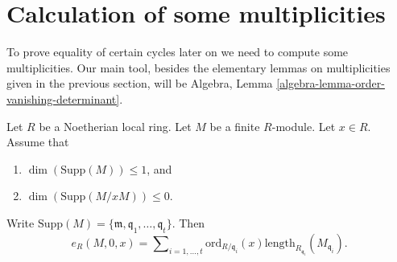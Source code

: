 \section{Calculation of some multiplicities}
\label{section-calculation}

\noindent
To prove equality of certain cycles later on we need to
compute some multiplicities. Our main tool, besides the
elementary lemmas on multiplicities given in the previous section,
will be Algebra, Lemma \ref{algebra-lemma-order-vanishing-determinant}.

\begin{lemma}
\label{lemma-length-multiplication}
Let $R$ be a Noetherian local ring.
Let $M$ be a finite $R$-module. Let $x \in R$. Assume that
\begin{enumerate}
\item $\dim(\text{Supp}(M)) \leq 1$, and
\item $\dim(\text{Supp}(M/xM)) \leq 0$.
\end{enumerate}
Write
$\text{Supp}(M) = \{\mathfrak m, \mathfrak q_1, \ldots, \mathfrak q_t\}$.
Then
$$
e_R(M, 0, x) =
\sum\nolimits_{i = 1, \ldots, t}
\text{ord}_{R/\mathfrak q_i}(x)
\text{length}_{R_{\mathfrak q_i}}(M_{\mathfrak q_i}).
$$
\end{lemma}

